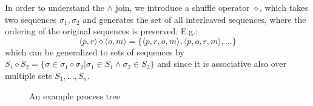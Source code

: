 \documentclass[a4paper]{IEEEtran}
\begin{document}

In order to understand the $\wedge$ join, we introduce a shuffle operator $\diamond$, which takes two sequences $\sigma_1, \sigma_2$ and generates the set of all interleaved sequences, where the ordering of the original sequences is preserved. E.g.: 
$$
\langle p,r\rangle \diamond \langle o,m \rangle = \{ \langle p,r,o,m \rangle, \langle p,o,r,m \rangle, ... \}
$$
which can be generalized to sets of sequences by $S_1 \diamond S_2 = \{ \sigma \in \sigma_1 \diamond \sigma_2 | \sigma_1 \in S_1 \wedge \sigma_2 \in S_2 \}$ and since it is associative also over multiple sets $S_1, \dots, S_n$.

\begin{figure}[h!]
    \centering
    \label{fig:my_label}
    
    \usetikzlibrary{graphdrawing.trees}
\caption{An example process tree}
\end{figure}
\end{document}
